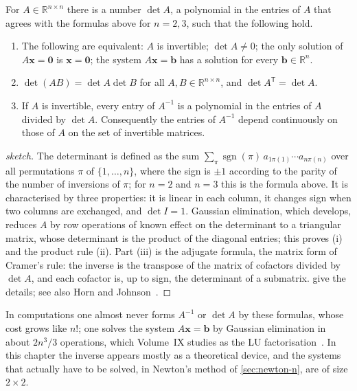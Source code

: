 \begin{theorem}
\label{thm:invertible-matrices}
For $A\in\mathbb R^{n\times n}$ there is a number $\det A$, a polynomial in the entries of $A$ that agrees with the formulas above for $n=2,3$, such that the following hold.
\begin{enumerate}
\item The following are equivalent: $A$ is invertible; $\det A\ne0$; the only solution of $A\mathbf x=\mathbf 0$ is $\mathbf x=\mathbf 0$; the system $A\mathbf x=\mathbf b$ has a solution for every $\mathbf b\in\mathbb R^n$.
\item $\det(AB)=\det A\det B$ for all $A,B\in\mathbb R^{n\times n}$, and $\det A^{\mathsf T}=\det A$.
\item If $A$ is invertible, every entry of $A^{-1}$ is a polynomial in the entries of $A$ divided by $\det A$. Consequently the entries of $A^{-1}$ depend continuously on those of $A$ on the set of invertible matrices.
\end{enumerate}
\end{theorem}

\begin{proof}[sketch]
The determinant is defined as the sum $\sum_\pi\operatorname{sgn}(\pi)\,a_{1\pi(1)}\cdots a_{n\pi(n)}$ over all permutations $\pi$ of $\{1,\ldots,n\}$, where the sign is $\pm1$ according to the parity of the number of inversions of $\pi$; for $n=2$ and $n=3$ this is the formula above. It is characterised by three properties: it is linear in each column, it changes sign when two columns are exchanged, and $\det I=1$. Gaussian elimination, which  develops, reduces $A$ by row operations of known effect on the determinant to a triangular matrix, whose determinant is the product of the diagonal entries; this proves (i) and the product rule (ii). Part (iii) is the adjugate formula, the matrix form of Cramer's rule: the inverse is the transpose of the matrix of cofactors divided by $\det A$, and each cofactor is, up to sign, the determinant of a submatrix.  give the details; see also Horn and Johnson~\cite[Sects.~0.3 and~0.5]{horn2013}.
\end{proof}

In computations one almost never forms $A^{-1}$ or $\det A$ by these formulas, whose cost grows like $n!$; one solves the system $A\mathbf x=\mathbf b$ by Gaussian elimination in about $2n^3/3$ operations, which Volume~IX studies as the LU factorisation~\cite{golub2013}. In this chapter the inverse appears mostly as a theoretical device, and the systems that actually have to be solved, in Newton's method of \cref{sec:newton-n}, are of size $2\times2$.

